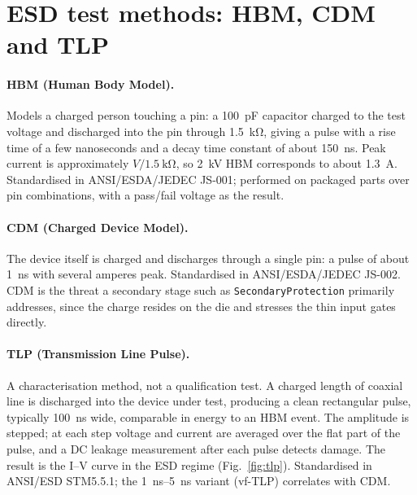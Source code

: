 \documentclass[11pt,a4paper]{article}
\newcommand{\cell}[1]{\texttt{#1}}
\begin{document}
\section{ESD test methods: HBM, CDM and TLP}

\paragraph{HBM (Human Body Model).}
Models a charged person touching a pin: a \SI{100}{\pico\farad} capacitor
charged to the test voltage and discharged into the pin through
\SI{1.5}{\kilo\ohm}, giving a pulse with a rise time of a few nanoseconds and a
decay time constant of about \SI{150}{\nano\second}. Peak current is
approximately $V/\SI{1.5}{\kilo\ohm}$, so \SI{2}{\kilo\volt} HBM corresponds to
about \SI{1.3}{\ampere}. Standardised in ANSI/ESDA/JEDEC JS-001; performed on
packaged parts over pin combinations, with a pass/fail voltage as the result.

\paragraph{CDM (Charged Device Model).}
The device itself is charged and discharges through a single pin: a pulse of
about \SI{1}{\nano\second} with several amperes peak. Standardised in
ANSI/ESDA/JEDEC JS-002. CDM is the threat a secondary stage such as
\cell{SecondaryProtection} primarily addresses, since the charge resides on the
die and stresses the thin input gates directly.

\paragraph{TLP (Transmission Line Pulse).}
A characterisation method, not a qualification test. A charged length of
coaxial line is discharged into the device under test, producing a clean
rectangular pulse, typically \SI{100}{\nano\second} wide, comparable in energy
to an HBM event. The amplitude is stepped; at each step voltage and current
are averaged over the flat part of the pulse, and a DC leakage measurement
after each pulse detects damage. The result is the I--V curve in the ESD
regime (Fig.~\ref{fig:tlp}). Standardised in ANSI/ESD STM5.5.1; the
\SIrange{1}{5}{\nano\second} variant (vf-TLP) correlates with CDM.
\end{document}

